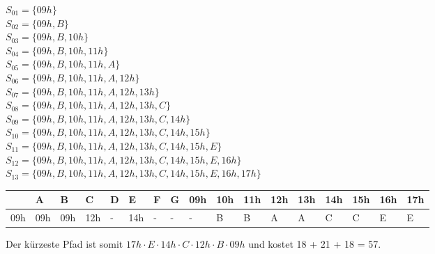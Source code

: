 \documentclass{article}
\begin{document}
\begin{enumerate}[\bfseries1.]
$S_{01} = \{09h\}$
\\$S_{02} = \{09h, B\}$
\\$S_{03} = \{09h, B, 10h\}$
\\$S_{04} = \{09h, B, 10h, 11h\}$
\\$S_{05} = \{09h, B, 10h, 11h, A\}$
\\$S_{06} = \{09h, B, 10h, 11h, A, 12h\}$
\\$S_{07} = \{09h, B, 10h, 11h, A, 12h, 13h\}$
\\$S_{08} = \{09h, B, 10h, 11h, A, 12h, 13h, C\}$
\\$S_{09} = \{09h, B, 10h, 11h, A, 12h, 13h, C, 14h\}$
\\$S_{10} = \{09h, B, 10h, 11h, A, 12h, 13h, C, 14h, 15h\}$
\\$S_{11} = \{09h, B, 10h, 11h, A, 12h, 13h, C, 14h, 15h, E\}$
\\$S_{12} = \{09h, B, 10h, 11h, A, 12h, 13h, C, 14h, 15h, E, 16h\}$
\\$S_{13} = \{09h, B, 10h, 11h, A, 12h, 13h, C, 14h, 15h, E, 16h, 17h\}$

\begin{tabular}{ l || l | l | l | l | l | l | l | l | l | l | l | l | l | l | l
| l |} 
    & A & B & C & D & E & F & G & 
    09h & 10h & 11h & 12h & 13h & 14h & 15h & 16h & 17h \\
    \hline
    09h & 09h & 09h & 12h & - & 14h & - & - & 
    - & B & B & A & A & C & C & E & E
    \\
    \hline
\end{tabular}

Der kürzeste Pfad ist somit
$17h \cdot E \cdot 14h \cdot C \cdot 12h \cdot B \cdot 09h$
und kostet 18 + 21 + 18 = 57.


\end{enumerate}
\end{document}
